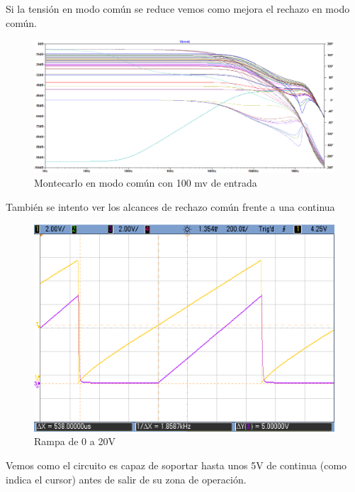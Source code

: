 \documentclass[a4paper]{article}
\begin{document}
Si la tensión en modo común se reduce vemos como mejora el rechazo en modo común.
\begin{figure}[H]
	\centering
	\includegraphics[height=0.3\textheight]{../ImagenesDeSimulaciones/MonteCarloModoComunGrande100mv.png}
	\caption{Montecarlo en modo común con 100 mv de entrada}
\end{figure} 

También se intento ver los alcances de rechazo común frente a una continua
\begin{figure}[H]
	\centering
	\includegraphics[height=0.3\textheight]{../ImagenesDeOsciloscopio/ModoComunContinua.png}
	\caption{Rampa de 0 a 20V}
\end{figure} 

Vemos como el circuito es capaz de soportar hasta unos 5V de continua (como indica el cursor) antes de salir de su zona de operación.
\end{document}
